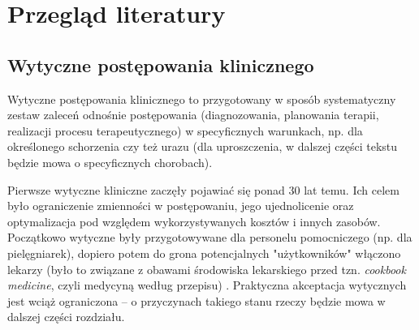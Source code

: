 \chapter{Przegląd literatury}
\section{Wytyczne postępowania klinicznego}



Wytyczne postępowania klinicznego to przygotowany w sposób systematyczny zestaw zaleceń odnośnie postępowania (diagnozowania, planowania terapii, realizacji procesu terapeutycznego) w specyficznych warunkach, np. dla określonego schorzenia czy też urazu \cite{Latoszek-Berendsen} (dla uproszczenia, w dalszej części tekstu będzie mowa o specyficznych chorobach).

Pierwsze wytyczne kliniczne zaczęły pojawiać się ponad 30 lat temu. Ich celem było ograniczenie zmienności w postępowaniu, jego ujednolicenie oraz optymalizacja pod względem wykorzystywanych kosztów i innych zasobów. Początkowo wytyczne były przygotowywane dla personelu pomocniczego (np. dla pielęgniarek), dopiero potem do grona potencjalnych "użytkowników" włączono lekarzy (było to związane z obawami środowiska lekarskiego przed tzn. \textit{cookbook medicine}, czyli medycyną według przepisu) \cite{Latoszek-Berendsen}. Praktyczna akceptacja wytycznych jest wciąż ograniczona -- o przyczynach takiego stanu rzeczy będzie mowa w dalszej części rozdziału.

